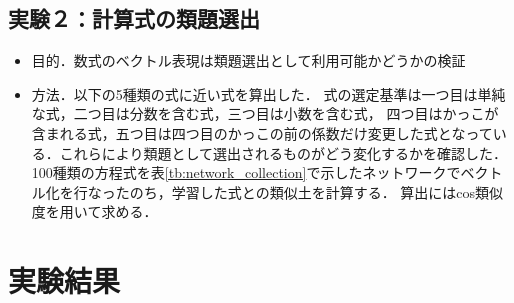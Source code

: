 \documentclass[a4j,11pt,report]{jsbook}
\begin{document}
\subsection{実験２：計算式の類題選出}
\begin{itemize}
  \item 目的．数式のベクトル表現は類題選出として利用可能かどうかの検証
  \item 方法．以下の5種類の式に近い式を算出した．
  式の選定基準は一つ目は単純な式，二つ目は分数を含む式，三つ目は小数を含む式，
  四つ目はかっこが含まれる式，五つ目は四つ目のかっこの前の係数だけ変更した式となっている．これらにより類題として選出されるものがどう変化するかを確認した．
  100種類の方程式を表\ref{tb:network_collection}で示したネットワークでベクトル化を行なったのち，学習した式との類似土を計算する．
  算出にはcos類似度を用いて求める．


\end{itemize}

\section{実験結果}
\end{document}
